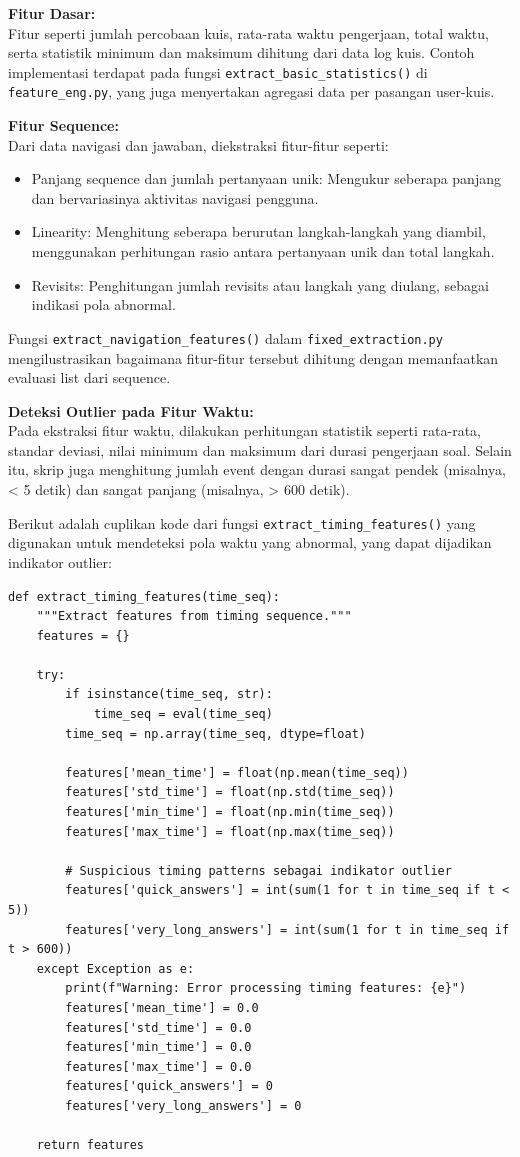 \textbf{Fitur Dasar:} \\
Fitur seperti jumlah percobaan kuis, rata-rata waktu pengerjaan, total waktu, serta statistik minimum dan maksimum dihitung dari data log kuis. Contoh implementasi terdapat pada fungsi \texttt{extract\_basic\_statistics()} di \texttt{feature\_eng.py}, yang juga menyertakan agregasi data per pasangan user-kuis.

\textbf{Fitur Sequence:} \\
Dari data navigasi dan jawaban, diekstraksi fitur-fitur seperti:
\begin{itemize}
    \item Panjang sequence dan jumlah pertanyaan unik: Mengukur seberapa panjang dan bervariasinya aktivitas navigasi pengguna.
    \item Linearity: Menghitung seberapa berurutan langkah-langkah yang diambil, menggunakan perhitungan rasio antara pertanyaan unik dan total langkah.
    \item Revisits: Penghitungan jumlah revisits atau langkah yang diulang, sebagai indikasi pola abnormal.
\end{itemize}
Fungsi \texttt{extract\_navigation\_features()} dalam \texttt{fixed\_extraction.py} mengilustrasikan bagaimana fitur-fitur tersebut dihitung dengan memanfaatkan evaluasi list dari sequence.

\textbf{Deteksi Outlier pada Fitur Waktu:} \\
Pada ekstraksi fitur waktu, dilakukan perhitungan statistik seperti rata-rata, standar deviasi, nilai minimum dan maksimum dari durasi pengerjaan soal. Selain itu, skrip juga menghitung jumlah event dengan durasi sangat pendek (misalnya, < 5 detik) dan sangat panjang (misalnya, > 600 detik).

Berikut adalah cuplikan kode dari fungsi \texttt{extract\_timing\_features()} yang digunakan untuk mendeteksi pola waktu yang abnormal, yang dapat dijadikan indikator outlier:

\begin{verbatim}
def extract_timing_features(time_seq):
    """Extract features from timing sequence."""
    features = {}
    
    try:
        if isinstance(time_seq, str):
            time_seq = eval(time_seq)
        time_seq = np.array(time_seq, dtype=float)
        
        features['mean_time'] = float(np.mean(time_seq))
        features['std_time'] = float(np.std(time_seq))
        features['min_time'] = float(np.min(time_seq))
        features['max_time'] = float(np.max(time_seq))
        
        # Suspicious timing patterns sebagai indikator outlier
        features['quick_answers'] = int(sum(1 for t in time_seq if t < 5))
        features['very_long_answers'] = int(sum(1 for t in time_seq if t > 600))
    except Exception as e:
        print(f"Warning: Error processing timing features: {e}")
        features['mean_time'] = 0.0
        features['std_time'] = 0.0
        features['min_time'] = 0.0
        features['max_time'] = 0.0
        features['quick_answers'] = 0
        features['very_long_answers'] = 0
    
    return features
\end{verbatim}


